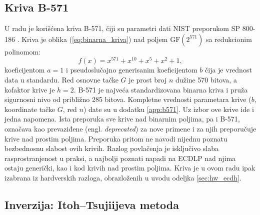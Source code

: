 \subsection{Kriva B-571}
\label{subsec:b571}

U radu je korišćena kriva B-571, čiji su parametri dati NIST preporukom SP 800-186 \cite{sp800186}. Kriva je oblika (\ref{eq:binarna_kriva}) nad poljem $\mathrm{GF}(2^{571})$ sa redukcionim polinomom:
\begin{equation}
    f(x) = x^{571} + x^{10} + x^5 + x^2 + 1,
\end{equation}
koeficijentom $a=1$ i pseudoslučajno generisanim koeficijentom $b$ čija je vrednost data u standardu. Red osnovne tačke $G$ je prost broj $n$ dužine 570 bitova, a kofaktor krive je $h=2$. B-571 je najveća standardizovana binarna kriva i pruža sigurnosni nivo od približno 285 bitova. Kompletne vrednosti parametara krive ($b$, koordinate tačke $G$, red $n$) date su u dodatku \ref{app:b571}.
\smallbreak
Uz izbor ove krive ide i jedna napomena. Ista preporuka \cite{sp800186} sve krive nad binarnim poljima, pa i B-571, označava kao prevaziđene (engl. \textit{deprecated}) za nove primene i za njih preporučuje krive nad prostim poljima. Preporuka pritom ne navodi nijednu poznatu bezbednosnu slabost ovih krivih. Razlog povlačenja je isključivo slaba rasprostranjenost u praksi, a najbolji poznati napadi na ECDLP nad njima ostaju generički, kao i kod krivih nad prostim poljima. Kriva je u ovom radu ipak izabrana iz hardverskih razloga, obrazloženih u uvodu odeljka \ref{sec:hw_ecdh}.

\subsection{Inverzija: Itoh--Tsujiijeva metoda}
\label{subsec:gf571_aritmetika}


